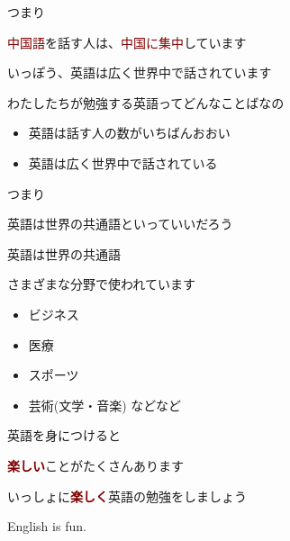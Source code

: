 \documentclass[
  ignorenonframetext,
  aspectratio=169,
  xcolor=dvipsnames]{beamer}
\providecommand{\tightlist}{%
  \setlength{\itemsep}{0pt}\setlength{\parskip}{0pt}}
\begin{document}
\begin{frame}{つまり}
\label{ux3064ux307eux308a-1}
\Large

\textcolor{Maroon}{中国語}を話す人は、\textcolor{Maroon}{中国に集中}しています\pause

いっぽう、\textcolor{NavyBlue}{英語は広く世界中で話されています}
\end{frame}

\begin{frame}{わたしたちが勉強する英語ってどんなことばなの}
\label{ux308fux305fux3057ux305fux3061ux304cux52c9ux5f37ux3059ux308bux82f1ux8a9eux3063ux3066ux3069ux3093ux306aux3053ux3068ux3070ux306aux306e}
\Large

\begin{itemize}[<+->]
\tightlist
\item
  英語は話す人の数が\textcolor{NavyBlue}{いちばんおおい}
\item
  英語は\textcolor{NavyBlue}{広く世界中で}話されている
\end{itemize}

\pause

つまり\pause

\textcolor{NavyBlue}{英語は世界の共通語}といっていいだろう
\end{frame}

\begin{frame}{英語は世界の共通語}
\label{ux82f1ux8a9eux306fux4e16ux754cux306eux5171ux901aux8a9e}
\Large

さまざまな分野で使われています

\begin{itemize}[<+->]
\tightlist
\item
  ビジネス
\item
  医療
\item
  スポーツ
\item
  芸術(文学・音楽) などなど
\end{itemize}
\end{frame}

\begin{frame}{英語を身につけると}
\label{ux82f1ux8a9eux3092ux8eabux306bux3064ux3051ux308bux3068}
\Large

\textcolor{Maroon}{\bfseries 楽しい}ことがたくさんあります\pause

いっしょに\textcolor{Maroon}{\bfseries 楽しく}英語の勉強をしましょう
\end{frame}

\begin{frame}{}
\label{section-2}
\Huge

\centering

English is fun.
\end{frame}
\end{document}
